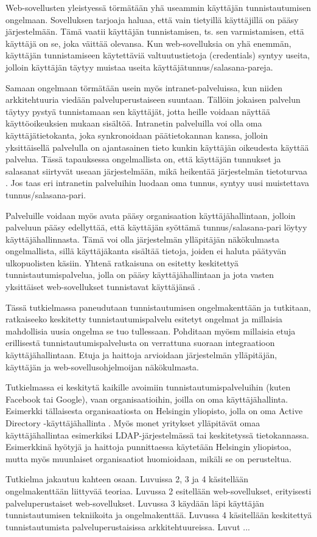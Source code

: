 Web-sovellusten yleistyessä törmätään yhä useammin käyttäjän tunnistautumisen ongelmaan. Sovelluksen tarjoaja haluaa, että vain tietyillä käyttäjillä on pääsy järjestelmään. Tämä vaatii käyttäjän tunnistamisen, ts. sen varmistamisen, että käyttäjä on se, joka väittää olevansa. Kun web-sovelluksia on yhä enemmän, käyttäjän tunnistamiseen käytettäviä valtuutustietoja (credentials) syntyy useita, jolloin käyttäjän täytyy muistaa useita käyttäjätunnus/salasana-pareja.

Samaan ongelmaan törmätään usein myös intranet-palveluissa, kun niiden arkkitehtuuria viedään palveluperustaiseen suuntaan. Tällöin jokaisen palvelun täytyy pystyä tunnistamaan sen käyttäjät, jotta heille voidaan näyttää käyttöoikeuksien mukaan sisältöä. Intranetin palveluilla voi olla oma käyttäjätietokanta, joka synkronoidaan päätietokannan kanssa, jolloin yksittäisellä palvelulla on ajantasainen tieto kunkin käyttäjän oikeudesta käyttää palvelua. Tässä tapauksessa ongelmallista on, että käyttäjän tunnukset ja salasanat siirtyvät useaan järjestelmään, mikä heikentää järjestelmän tietoturvaa \cite{nisti}. Jos taas eri intranetin palveluihin luodaan oma tunnus, syntyy uusi muistettava tunnus/salasana-pari.

Palveluille voidaan myös avata pääsy organisaation käyttäjähallintaan, jolloin palveluun pääsy edellyttää, että käyttäjän syöttämä tunnus/salasana-pari löytyy käyttäjähallinnasta. Tämä voi olla järjestelmän ylläpitäjän näkökulmasta ongelmallista, sillä käyttäjäkanta sisältää tietoja, joiden ei haluta päätyvän ulkopuolisten käsiin. Yhtenä ratkaisuna on esitetty keskitettyä tunnistautumispalvelua, jolla on pääsy käyttäjähallintaan ja jota vasten yksittäiset web-sovellukset tunnistavat käyttäjänsä \cite{nisti}.

Tässä tutkielmassa paneudutaan tunnistautumisen ongelmakenttään ja tutkitaan, ratkaiseeko keskitetty tunnistautumispalvelu esitetyt ongelmat ja millaisia mahdollisia uusia ongelma se tuo tullessaan. Pohditaan myösm millaisia etuja erillisestä tunnistautumispalvelusta on verrattuna suoraan integraatioon käyttäjähallintaan. Etuja ja haittoja arvioidaan järjestelmän ylläpitäjän, käyttäjän ja web-sovellusohjelmoijan näkökulmasta.

Tutkielmassa ei keskitytä kaikille avoimiin tunnistautumispalveluihin (kuten Facebook tai Google), vaan organisaatioihin, joilla on oma käyttäjähallinta. Esimerkki tällaisesta organisaatiosta on Helsingin yliopisto, jolla on oma Active Directory -käyttäjähallinta \cite{tietotekniikkaa}. Myös monet yritykset ylläpitävät omaa käyttäjähallintaa esimerkiksi LDAP-järjestelmässä tai keskitetyssä tietokannassa. Esimerkkinä hyötyjä ja haittoja punnittaessa käytetään Helsingin yliopistoa, mutta myös muunlaiset organisaatiot huomioidaan, mikäli se on perusteltua.

Tutkielma jakautuu kahteen osaan. Luvuissa 2, 3 ja 4 käsitellään ongelmakenttään liittyvää teoriaa. Luvussa 2 esitellään web-sovellukset, erityisesti palveluperustaiset web-sovellukset. Luvussa 3 käydään läpi käyttäjän tunnistautumisen tekniikoita ja ongelmakenttää. Luvussa 4 käsitellään keskitettyä tunnistautumista palveluperustaisissa arkkitehtuureissa. Luvut ...
